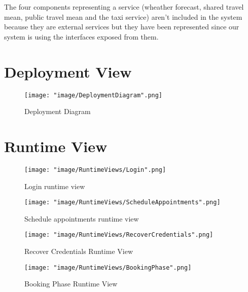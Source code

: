 The four components representing a service (wheather forecast, shared travel mean, public travel mean and the taxi service) aren't included in the system because they are external services but they have been represented since our system is using the interfaces exposed from them.

\section{Deployment View}

\begin{figure}[H]
\begin{center}
\texttt{[image: "image/DeploymentDiagram".png]}
\caption{Deployment Diagram}
\end{center}
\end{figure}

\section{Runtime View}

\begin{figure}[H]
\begin{center}
\texttt{[image: "image/RuntimeViews/Login".png]}
\caption{Login runtime view}
\end{center}
\end{figure}

\begin{figure}[H]
\begin{center}
\texttt{[image: "image/RuntimeViews/ScheduleAppointments".png]}
\caption{Schedule appointments runtime view}
\end{center}
\end{figure}

\begin{figure}[H]
\begin{center}

\texttt{[image: "image/RuntimeViews/RecoverCredentials".png]}
\caption{Recover Credentials Runtime View}
\end{center}
\end{figure}

\begin{figure}[H]
\begin{center}
\texttt{[image: "image/RuntimeViews/BookingPhase".png]}
\caption{Booking Phase Runtime View}
\end{center}
\end{figure}

